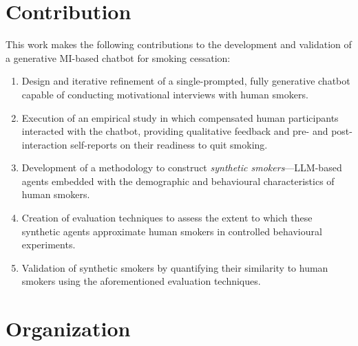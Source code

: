 \section{Contribution}

This work makes the following contributions to the development and validation of a generative MI-based chatbot for smoking cessation:

\begin{enumerate}
	\item Design and iterative refinement of a single-prompted, fully generative chatbot capable of conducting motivational interviews with human smokers.

	\item Execution of an empirical study in which compensated human participants interacted with the chatbot, providing qualitative feedback and pre- and post-interaction self-reports on their readiness to quit smoking.

	\item Development of a methodology to construct \emph{synthetic smokers}---LLM-based agents embedded with the demographic and behavioural characteristics of human smokers.

	\item Creation of evaluation techniques to assess the extent to which these synthetic agents approximate human smokers in controlled behavioural experiments.

	\item Validation of synthetic smokers by quantifying their similarity to human smokers using the aforementioned evaluation techniques.

\end{enumerate}

\section{Organization}

